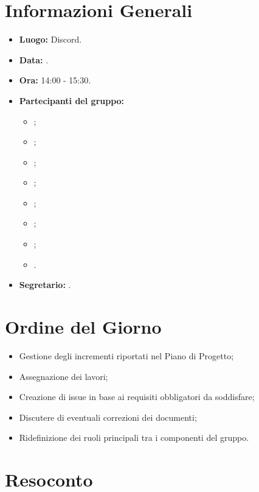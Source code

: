 \section{Informazioni Generali}
\begin{itemize}
\item \textbf{Luogo:} Discord.
\item \textbf{Data:} \Data.
\item \textbf{Ora:} 14:00 - 15:30.
\item \textbf{Partecipanti del gruppo:}
	\begin{itemize}
		\item \AT{}; 
		\item \BR{};
		\item \CE{}; 
		\item \DF{};
		\item \LD{};
		\item \MC{};
		\item \PF{};
		\item \SE{}.
	\end{itemize} 
\item \textbf{Segretario:} \SE{}.
\end{itemize}

\section{Ordine del Giorno}
\begin{itemize}
	\item Gestione degli incrementi riportati nel Piano di Progetto;
	\item Assegnazione dei lavori;
	\item Creazione di issue in base ai requisiti obbligatori da soddisfare;
	\item Discutere di eventuali correzioni dei documenti;
	\item Ridefinizione dei ruoli principali tra i componenti del gruppo.
\end{itemize}


\section{Resoconto}


